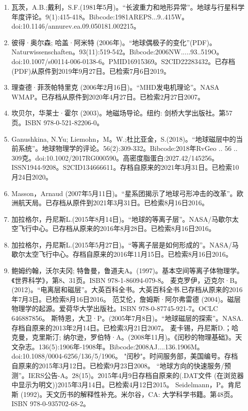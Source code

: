 \begin{enumerate}
\item 瓦茨，A.B.;戴利，S.F.(1981年5月)。“长波重力和地形异常”。地球与行星科学年度评论。9(1):415-418。Bibcode:1981AREPS...9..415W。doi:10.1146/annurev.ea.09.050181.002215。
\item 彼得·奥尔森; 哈盖·阿米特 (2006年)。“地球偶极子的变化”(PDF)。Naturwissenschaften。93(11):519-542。Bibcode:2006NW.....93..519O。doi:10.1007/s00114-006-0138-6。PMID16915369。S2CID22283432。已存档(PDF)从原件到2019年9月27日。已检索7月6日2019。   
\item 理查德·菲茨帕特里克 (2006年2月16日)。“MHD发电机理论”。NASA WMAP。已存档从原件到2020年4月27日。已检索2月27日2007。
\item 坎贝尔，华莱士·霍尔 (2003)。地磁场导论。纽约: 剑桥大学出版社。第57页。ISBN 978-0-521-82206-0。
\item Ganushkina, N.Yu; Liemohn，M。W.;杜比亚金，S.(2018)。“地球磁层中的当前系统”。地球物理学的评论。56(2):309-332。Bibcode:2018年RvGeo .. 56 .. 309克。doi:10.1002/2017RG000590。高密度脂蛋白:2027.42/145256。ISSN1944-9208。S2CID134666611。存档自原来的2021年3月31日。已检索10月24日2020。  
\item Masson，Arnaud (2007年5月11日)。“星系团揭示了地球弓形冲击的改革”。欧洲航天局。已存档从原件到2021年3月31日。已检索8月16日2016。
\item 加拉格尔，丹尼斯L.(2015年8月14日)。“地球的等离子层”。NASA/马歇尔太空飞行中心。已存档从原来的2016年8月28日。已检索8月16日2016。
\item 加拉格尔，丹尼斯L.(2015年5月27日)。“等离子层是如何形成的”。NASA/马歇尔太空飞行中心。存档自原来的2016年11月15日。已检索8月16日2016。
\item 鲍姆约翰，沃尔夫冈; 特鲁曼，鲁道夫A。(1997)。基本空间等离子体物理学。《世界科学》，第8、31页。ISBN 978-1-86094-079-8。
 麦克罗伊，迈克尔·B。(2012)。“电离层和磁层”。大英百科全书。大英百科全书.已存档从原来的2016年7月3日。已检索8月16日2016。
 范艾伦，詹姆斯·阿尔弗雷德 (2004)。磁层物理学的起源。爱荷华大学出版社。ISBN 978-0-87745-921-7。OCLC 646887856。
 斯特恩，大卫·P。(2005年7月8日)。“地球磁层的探索”。NASA.存档自原来的2013年2月14日。已检索3月21日2007。
 麦卡锡，丹尼斯D.；哈克曼，克里斯汀; 纳尔逊，罗伯特·A。(2008年11月)。《闰秒的物理基础》。天文杂志。136(5):1906年-1908年。Bibcode:2008AJ....136.1906M。doi:10.1088/0004-6256/136/5/1906。
 "闰秒"。时间服务部，美国编号。存档自原来的2015年3月12日。已检索9月23日2008。
 “地球方向的快速服务/预测”。IERS公告-A。28(15)。2015年4月9日存档自原来的(.DAT文件 (在浏览器中显示为明文))2015年3月14日。已检索4月12日2015。
 Seidelmann，P。肯尼斯 (1992)。天文历书的解释性补充。米尔谷，CA: 大学科学书籍。第48页。ISBN 978-0-935702-68-2。

\end{enumerate}
